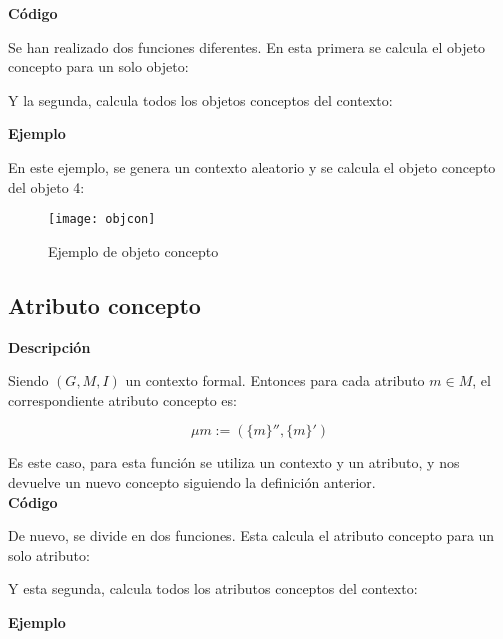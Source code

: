         \clearpage

        \textbf{C\'odigo}

        Se han realizado dos funciones diferentes. En esta primera se calcula el objeto concepto para un solo objeto:
        
        

        Y la segunda, calcula todos los objetos conceptos del contexto:
        

        \bigskip

        \textbf{Ejemplo}

        En este ejemplo, se genera un contexto aleatorio y se calcula el objeto concepto del objeto 4:

        \begin{figure}[H]
            \centering
            \texttt{[image: objcon]}
            \caption{Ejemplo de objeto concepto}
            \label{fig:objcon}
        \end{figure}




    \subsection{Atributo concepto}

    
        \textbf{Descripci\'on}

        Siendo \( (G, M, I) \) un contexto formal. Entonces para cada atributo \( m \in M\), el correspondiente atributo concepto es:

        \[ \mu m:=(\{m\}'', \{m\}') \]

        Es este caso, para esta funci\'on se utiliza un contexto y un atributo, y nos devuelve un nuevo concepto siguiendo la definici\'on 
        anterior.
        \\


        \textbf{C\'odigo}

        De nuevo, se divide en dos funciones. Esta calcula el atributo concepto para un solo atributo:

        

        Y esta segunda, calcula todos los atributos conceptos del contexto:
        

        \clearpage

        \textbf{Ejemplo}

